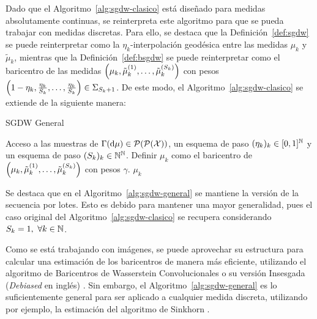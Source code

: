 Dado que el Algoritmo~\ref{alg:sgdw-clasico} está diseñado para medidas absolutamente continuas, se reinterpreta este algoritmo para que se pueda trabajar con medidas discretas. Para ello, se destaca que la Definición~\ref{def:sgdw} se puede reinterpretar como la $\eta_k$-interpolación geodésica entre las medidas $\mu_k$ y $\tilde \mu_k$, mientras que la Definición~\ref{def:bsgdw} se puede reinterpretar como el baricentro de las medidas $\qty( \mu_k, \tilde\mu_k^{(1)}, \dots, \tilde\mu_k^{(S_k)} )$ con pesos $\qty(1-\eta_k, \frac{\eta_k}{S_k}, \dots, \frac{\eta_k}{S_k}) \in \Simplex[S_k+1]$. De este modo, el Algoritmo~\ref{alg:sgdw-clasico} se extiende de la siguiente manera:
\begin{algorithm}[H]
    \caption{SGDW General}
    \label{alg:sgdw-general}
    \begin{algorithmic}[1]
        \Require Acceso a las muestras de $\Gamma(\dd \mu) \in \ProbSpace[\ProbSpace]$, un esquema de paso $(\eta_k)_k \in [0, 1]^\N$ y un esquema de paso $(S_k)_k \in \N^\N$.
        \Repeat
        \State Definir $\mu_k$ como el baricentro de $\qty( \mu_k, \tilde\mu_k^{(1)}, \dots, \tilde\mu_k^{(S_k)} )$ con pesos $\gamma$.
        \State\Return $\mu_k$
    \end{algorithmic}
\end{algorithm}

Se destaca que en el Algoritmo~\ref{alg:sgdw-general} se mantiene la versión de la secuencia por lotes. Esto es debido para mantener una mayor generalidad, pues el caso original del Algoritmo~\ref{alg:sgdw-clasico} se recupera considerando $S_k=1,\ \forall k\in\N$.


Como se está trabajando con imágenes, se puede aprovechar su estructura para calcular una estimación de los baricentros de manera más eficiente, utilizando el algoritmo de Baricentros de Wasserstein Convolucionales \cite{solomon2015convolutional} o su versión Insesgada (\textit{Debiased} en inglés) \cite{janati2020debiased}. Sin embargo, el Algoritmo~\ref{alg:sgdw-general} es lo suficientemente general para ser aplicado a cualquier medida discreta, utilizando por ejemplo, la estimación del algoritmo de Sinkhorn \cite{cuturi2013sinkhorn}.


